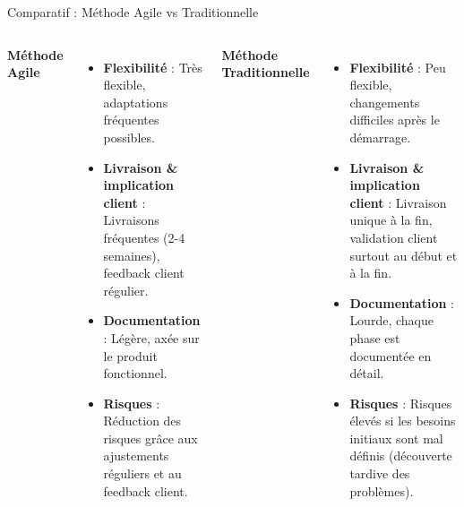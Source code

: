\documentclass{beamer}
\begin{document}
\begin{frame}{Comparatif : Méthode Agile vs Traditionnelle}
  \scriptsize
  \begin{columns}
    \textbf{Méthode Agile}
    \begin{itemize}
      \item \textbf{Flexibilité} : Très flexible, adaptations fréquentes possibles.
      \item \textbf{Livraison \& implication client} : Livraisons fréquentes (2-4 semaines), feedback client régulier.
      \item \textbf{Documentation} : Légère, axée sur le produit fonctionnel.
      \item \textbf{Risques} : Réduction des risques grâce aux ajustements réguliers et au feedback client.
    \end{itemize}
    \textbf{Méthode Traditionnelle}
    \begin{itemize}
      \item \textbf{Flexibilité} : Peu flexible, changements difficiles après le démarrage.
      \item \textbf{Livraison \& implication client} : Livraison unique à la fin, validation client surtout au début et à la fin.
      \item \textbf{Documentation} : Lourde, chaque phase est documentée en détail.
      \item \textbf{Risques} : Risques élevés si les besoins initiaux sont mal définis (découverte tardive des problèmes).
    \end{itemize}
  \end{columns}
\end{frame}
\end{document}
